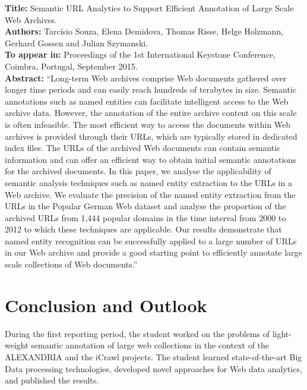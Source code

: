 \documentclass[a4paper,11pt]{report}
\begin{document}
\textbf{Title:} Semantic URL Analytics to Support Efficient Annotation of Large Scale Web Archives. \\
\textbf{Authors:} Tarcísio Souza, Elena Demidova, Thomas Risse, Helge Holzmann, Gerhard Gossen and Julian Szymanski. \\
\textbf{To appear in:} Proceedings of the 1st International Keystone Conference, Coimbra, Portugal, September 2015.\\
\textbf{Abstract:}
``Long-term Web archives comprise Web documents gathered over longer time periods and can easily reach hundreds of terabytes in size.
Semantic annotations such as named entities can facilitate intelligent access to the Web archive data. 
However, the annotation of the entire archive content on this scale is often infeasible. The most efficient way to access the documents within Web archives is provided through their URLs, which are typically stored in 
dedicated index files. The URLs of the archived Web documents can contain
semantic information and can offer an efficient way to obtain initial semantic annotations for the archived documents. 
In this paper, we analyse the applicability of semantic analysis techniques such as named entity extraction
to the URLs in a Web archive. We evaluate the precision of the named entity
extraction from the URLs in the Popular German Web dataset and analyse the
proportion of the archived URLs from 1,444 popular domains in the time interval from 2000 to 2012 to which these techniques are applicable.
Our results demonstrate that named entity recognition can be successfully applied to a large number of URLs in 
our Web archive and provide a good starting point to efficiently annotate large scale collections of Web documents.''



\chapter {Conclusion and Outlook}

During the first reporting period, the student worked on the problems 
of light-weight semantic annotation of large web collections in the 
context of the ALEXANDRIA and the iCrawl projects. The student learned 
state-of-the-art Big Data processing technologies,
developed novel approaches for Web data analytics, and published the results.
\end{document}
